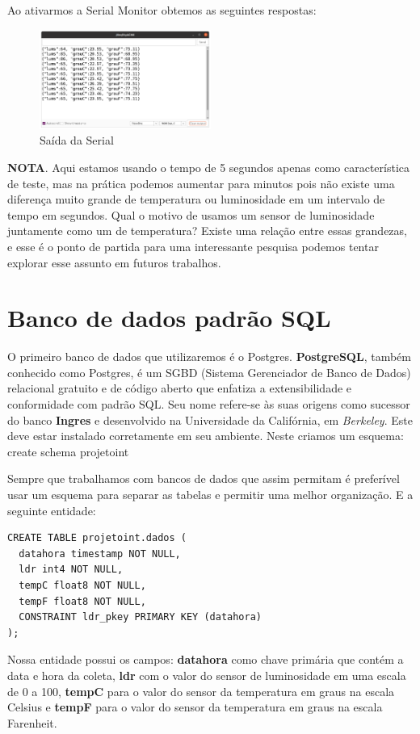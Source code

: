 \documentclass[a4paper,11pt]{article}
\begin{document}
Ao ativarmos a Serial Monitor obtemos as seguintes respostas:
\begin{figure}[H]
	\centering
	\includegraphics[width=0.50\textwidth]{images/saida}
	\caption{Saída da Serial}
\end{figure}

\textbf{NOTA}. Aqui estamos usando o tempo de 5 segundos apenas como característica de teste, mas na prática podemos aumentar para minutos pois não existe uma diferença muito grande de temperatura ou luminosidade em um intervalo de tempo em segundos. Qual o motivo de usamos um sensor de luminosidade juntamente como um de temperatura? Existe uma relação entre essas grandezas, e esse é o ponto de partida para uma interessante pesquisa podemos tentar explorar esse assunto em futuros trabalhos.

\section*{Banco de dados padrão SQL}
O primeiro banco de dados que utilizaremos é o Postgres. \textbf{PostgreSQL}, também conhecido como Postgres, é um SGBD (Sistema Gerenciador de Banco de Dados) relacional gratuito e de código aberto que enfatiza a extensibilidade e conformidade com padrão SQL. Seu nome refere-se às suas origens como sucessor do banco \textbf{Ingres} e desenvolvido na Universidade da Califórnia, em \textit{Berkeley}. Este deve estar instalado corretamente em seu ambiente. Neste criamos um esquema: \\
{\ttfamily create schema projetoint}

Sempre que trabalhamos com bancos de dados que assim permitam é preferível usar um esquema para separar as tabelas e permitir uma melhor organização. E a seguinte entidade:
\begin{lstlisting}[]
CREATE TABLE projetoint.dados (
  datahora timestamp NOT NULL,
  ldr int4 NOT NULL,
  tempC float8 NOT NULL,
  tempF float8 NOT NULL,
  CONSTRAINT ldr_pkey PRIMARY KEY (datahora)
);
\end{lstlisting}

Nossa entidade possui os campos: \textbf{datahora} como chave primária que contém a data e hora da coleta, \textbf{ldr} com o valor do sensor de luminosidade em uma escala de 0 a 100, \textbf{tempC} para o valor do sensor da temperatura em graus na escala Celsius e \textbf{tempF} para o valor do sensor da temperatura em graus na escala Farenheit.
\end{document}
